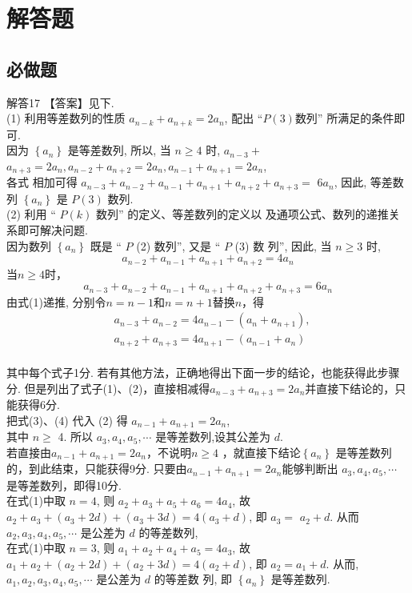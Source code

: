 \documentclass[11pt]{article}
\begin{document}
\section{\heiti 解答题}
\subsection{\heiti 必做题}
\heiti 解答17    \songti 【答案】见下.
\\(1) \fangsong 利用等差数列的性质 $a_{n-k}+a_{n+k}=2 a_{n}$, 配出 “$P (3) $数列” 所满足的条件即可. \songti \\
因为 $\left\{a_{n}\right\}$ 是等差数列, 所以, 当 $n \geqslant 4$ 时, $a_{n-3}+$ $a_{n+3}=2 a_{n}, a_{n-2}+a_{n+2}=2 a_{n}, a_{n-1}+a_{n+1}=2 a_{n}$,\\各式 相加可得 $a_{n-3}+a_{n-2}+a_{n-1}+a_{n+1}+a_{n+2}+a_{n+3}=$ $6 a_{n}$, 因此, 等差数列 $\left\{a_{n}\right\}$ 是 $P(3)$ 数列.
\\(2) \fangsong 利用 “ $P(k)$ 数列” 的定义、等差数列的定义以 及通项公式、数列的递推关系即可解决问题.
\\ \songti 因为数列 $\left\{a_{n}\right\}$ 既是 “ $P$ (2) 数列”, 又是 “ $P$ (3) 数 列”, 因此, 当 $n \geqslant 3$ 时,
\begin{equation}
	a_{n-2}+a_{n-1}+a_{n+1}+a_{n+2}=4 a_{n} \label{1}
\end{equation}
当$n \geqslant 4$时， 
\begin{equation}	
	a_{n-3}+a_{n-2}+a_{n-1}+a_{n+1}+a_{n+2}+a_{n+3}=6 a_{n} \label{2}
\end{equation}
由式(1)递推, 分别令$n=n-1$和$n=n+1$替换$n$，得
\begin{align}
	&a_{n-3}+a_{n-2}=4 a_{n-1}-\left(a_{n}+a_{n+1}\right), \label{3}\\
	&a_{n+2}+a_{n+3}=4 a_{n+1}-\left(a_{n-1}+a_{n}\right) \label{4}
\end{align}
\\
\kaishu 其中每个式子1分. 若有其他方法，正确地得出下面一步的结论，也能获得此步骤分. 但是列出了式子(1)、(2)，直接相减得$a_{n-3}+a_{n+3}=2 a_{n}$并直接下结论的，只能获得6分. \songti
\\
把式(3)、(4) 代入 (2) 得 $a_{n-1}+a_{n+1}=2 a_{n}$, 
\\其中 $n \geqslant$ 4. 所以 $a_{3}, a_{4}, a_{5}, \cdots$ 是等差数列,设其公差为 $d$.  
\\ \kaishu 若直接由$a_{n-1}+a_{n+1}=2 a_{n}$，不说明$n \geqslant 4$ ，就直接下结论$\left\{a_{n}\right\}$ 是等差数列的，到此结束，只能获得9分. 只要由$a_{n-1}+a_{n+1}=2 a_{n}$能够判断出 $a_{3}, a_{4}, a_{5}, \cdots$ 是等差数列，即得10分.\songti
\\
在式(1)中取 $n=4$, 则 $a_{2}+a_{3}+a_{5}+a_{6}=4 a_{4}$, 故 $a_{2}+a_{3}+\left(a_{3}+2 d\right)+\left(a_{3}+3 d\right)=4\left(a_{3}+d\right)$, 即 $a_{3}=$ $a_{2}+d$. 从而 $a_{2}, a_{3}, a_{4}, a_{5}, \cdots$ 是公差为 $d$ 的等差数列, 
\\在式(1)中取 $n=3$, 则 $a_{1}+a_{2}+a_{4}+a_{5}=4 a_{3}$, 故 $a_{1}+a_{2}+\left(a_{2}+2 d\right)+\left(a_{2}+3 d\right)=4\left(a_{2}+d\right)$,
即 $a_{2}=a_{1}+d$.
从而, $a_{1}, a_{2}, a_{3}, a_{4}, a_{5}, \cdots$ 是公差为 $d$ 的等差数 列, 即 $\left\{a_{n}\right\}$ 是等差数列. 
\end{document}
